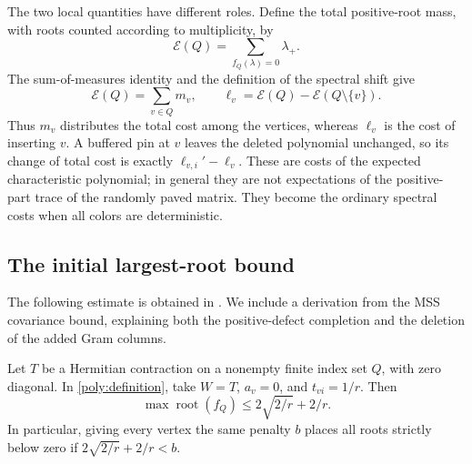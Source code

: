 The two local quantities have different roles. Define the total
positive-root mass, with roots counted according to multiplicity, by
\begin{equation}\label{poly:total-cost}
 \mathcal E(Q)=\sum_{f_Q(\lambda)=0}\lambda_+.
\end{equation}
The sum-of-measures identity and the definition of the spectral shift give
\begin{equation}\label{poly:cost-response}
 \mathcal E(Q)=\sum_{v\in Q}m_v,\qquad
 \ell_v=\mathcal E(Q)-\mathcal E(Q\setminus\{v\}).
\end{equation}
Thus $m_v$ distributes the total cost among the vertices, whereas
$\ell_v$ is the cost of inserting $v$. A buffered pin at $v$ leaves
the deleted polynomial unchanged, so its change of total cost is
exactly $\ell_{v,i}'-\ell_v$. These are costs of the expected
characteristic polynomial; in general they are not expectations of
the positive-part trace of the randomly paved matrix. They become
the ordinary spectral costs when all colors are deterministic.

\subsection{The initial largest-root bound}

The following estimate is obtained in
\cite[Lemma~24 and proof of Theorem~25]{RS21}. We include a derivation
from the MSS covariance bound, explaining both the positive-defect
completion and the deletion of the added Gram columns.

\begin{lemma}\label{lem:mss-paving}
Let $T$ be a Hermitian contraction on a nonempty finite index set $Q$,
with zero diagonal. In \eqref{poly:definition}, take $W=T$, $a_v=0$,
and $t_{vi}=1/r$. Then
\begin{equation}\label{poly:mss-bound}
 \max\operatorname{root}(f_Q)\leq2\sqrt{2/r}+2/r.
\end{equation}
In particular, giving every vertex the same penalty $b$ places all
roots strictly below zero if $2\sqrt{2/r}+2/r<b$.
\end{lemma}

